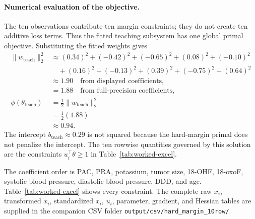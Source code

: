 \documentclass[11pt,a4paper]{article}
\numberwithin{equation}{section} %
\begin{document}
\paragraph{Numerical evaluation of the objective.}
The ten observations contribute ten margin constraints; they do not create ten additive loss terms. Thus the fitted teaching subsystem has one global primal objective. Substituting the fitted weights gives
\begin{equation}
\begin{aligned}
\lVert w_{\mathrm{teach}}\rVert_2^2
&\approx (0.34)^2+(-0.42)^2+(-0.65)^2+(0.08)^2+(-0.10)^2\\
&\quad +(0.16)^2+(-0.13)^2+(0.39)^2+(-0.75)^2+(0.64)^2\\
&\approx 1.90\quad\text{from displayed coefficients},\\
&=1.88\quad\text{from full-precision coefficients},\\[2pt]
\phi(\theta_{\mathrm{teach}})
&=\frac12\lVert w_{\mathrm{teach}}\rVert_2^2\\
&=\frac12(1.88)\\
&\approx\boxed{0.94}.
\end{aligned}
\end{equation}
The intercept
$b_{\mathrm{teach}}\approx0.29$ is not squared because the hard-margin primal
does not penalize the intercept. The ten rowwise quantities governed by this
solution are the constraints $u_i^{\top}\theta\geq1$ in
Table~\ref{tab:worked-excel}.

The coefficient order is PAC, PRA, potassium, tumor size, 18-OHF, 18-oxoF, systolic blood pressure, diastolic blood pressure, DDD, and age. Table~\ref{tab:worked-excel} shows every constraint. The complete raw $x_i$, transformed $x_i$, standardized $x_i$, $u_i$, parameter, gradient, and Hessian tables are supplied in the companion CSV folder \texttt{output/csv/hard\_margin\_10row/}.
\end{document}
